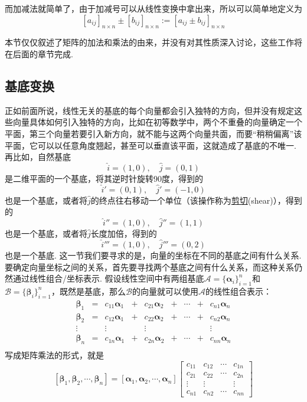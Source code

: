 \documentclass[main.tex]{subfiles}
\begin{document}
而加减法就简单了，由于加减号可以从线性变换中拿出来，所以可以简单地定义为
\[[a_{ij}]_{n\times n} \pm [b_{ij}]_{n \times n} := [a_{ij} \pm b_{ij}]_{n \times n}\]

本节仅仅叙述了矩阵的加法和乘法的由来，并没有对其性质深入讨论，这些工作将在后面的章节完成.

\subsection{基底变换}

正如前面所说，线性无关的基底的每个向量都会引入独特的方向，但并没有规定这些向量具体如何引入独特的方向，比如在初等数学中，两个不重叠的向量确定一个平面，第三个向量若要引入新方向，就不能与这两个向量共面，而要“稍稍偏离”该平面，它可以以任意角度翘起，甚至可以垂直该平面，这就造成了基底的不唯一. 再比如，自然基底
\[\hat i = (1,0), \quad \hat j = (0,1)\]
是二维平面的一个基底，将其逆时针旋转90度，得到的
\[\hat i' = (0,1), \quad \hat j' = (-1,0)\]
也是一个基底，或者将\(\hat j\)的终点往右移动一个单位（该操作称为\uline{剪切}(shear)），得到的
\[\hat i'' = (1,0), \quad \hat j'' = (1,1)\]
也是一个基底，或者将\(\hat j\)长度加倍，得到的
\[\hat i''' = (1,0), \quad \hat j''' = (0,2)\]
也是一个基底. 这一节我们要寻求的是，向量的坐标在不同的基底之间有什么关系. 要确定向量坐标之间的关系，首先要寻找两个基底之间有什么关系，而这种关系仍然通过线性组合/坐标表示. 假设线性空间中有两组基底\(\mathcal A = \{\bm\alpha_i\}_{i=1}^n\)和\(\mathcal B = \{\bm\beta_i\}_{i=1}^n\)，既然是基底，那么\(\mathcal B\)的向量就可以使用\(\mathcal A\)的线性组合表示：
\[
    \begin{array}{ccccccccc}
        \bm{\beta}_1 &=& c_{11} \bm{\alpha}_1  & + & c_{21} \bm{\alpha}_2 & + & \cdots & + & c_{n1} \bm{\alpha}_n \\
        \bm{\beta}_2 &=& c_{12} \bm{\alpha}_1  & + & c_{22} \bm{\alpha}_2 & + & \cdots & + & c_{n2} \bm{\alpha}_n \\
        \vdots & & \vdots & & \vdots & & & & \vdots\\
        \bm{\beta}_n &=& c_{1n} \bm{\alpha}_1  & + & c_{2n} \bm{\alpha}_2 & + & \cdots & + & c_{nn} \bm{\alpha}_n \\
    \end{array}
\]
写成矩阵乘法的形式，就是
\[ 
    [\bm{\beta}_1, \bm{\beta}_2, \cdots, \bm{\beta}_n] = 
    [\bm{\alpha}_1, \bm{\alpha}_2,\cdots,\bm{\alpha}_n]
    \begin{bmatrix}
        c_{11} & c_{12} & \cdots & c_{1n} \\
        c_{21} & c_{22} & \cdots & c_{2n} \\
        \vdots & \vdots &  & \vdots \\
        c_{n1} & c_{n2}  & \cdots & c_{nn}
    \end{bmatrix}
\]
\end{document}
